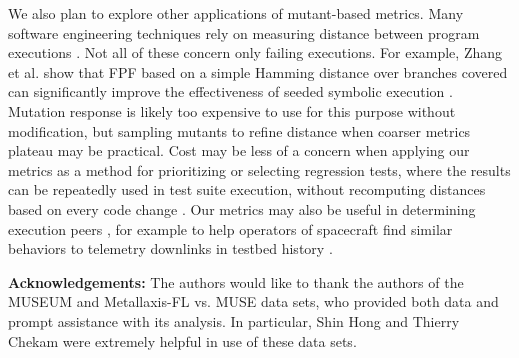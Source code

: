 We also plan to explore other applications of mutant-based metrics.
Many software engineering techniques rely on measuring distance
between program executions \cite{BallConcept,NearNeighbor}.  Not all
of these concern only failing
executions.  For example, Zhang et al. \cite{issta14} show that FPF based on a simple
Hamming distance over branches covered can significantly improve the
effectiveness of seeded symbolic execution
\cite{Zesti,PersonSeed,BugRedux}.  Mutation response is likely too
expensive to use for this purpose without modification, but sampling
mutants to refine distance when coarser metrics plateau
may be practical.  Cost may be less of a concern when applying our
metrics as a method for prioritizing or selecting regression tests,
where the results can be repeatedly used in test suite execution,
without recomputing distances based on every code change
\cite{YooHarman}.  Our metrics may also be useful in determining
execution peers \cite{Sumner2011}, for example to help operators of
spacecraft find similar behaviors to telemetry downlinks in testbed
history \cite{KlausRajeev,scriptstospecs}.

{\scriptsize {\bf Acknowledgements:} The authors would like to thank the authors of
the MUSEUM \cite{multilingual} and Metallaxis-FL vs. MUSE 
\cite{Papadakis} data sets, who provided both data and prompt assistance with
its analysis.  In particular, Shin Hong and Thierry Chekam were
extremely helpful in use of these data sets.}